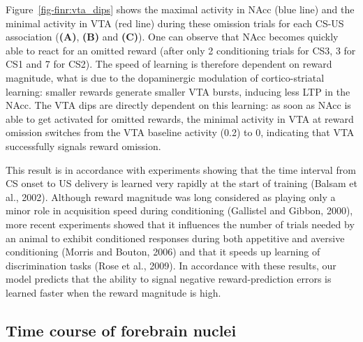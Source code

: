 \documentclass[
  11pt,
  a4paper,
]{scrbook}
\begin{document}
Figure~\ref{fig-finr:vta_dips} shows the maximal activity in NAcc (blue
line) and the minimal activity in VTA (red line) during these omission
trials for each CS-US association (\textbf{(A)}, \textbf{(B)} and
\textbf{(C)}). One can observe that NAcc becomes quickly able to react
for an omitted reward (after only 2 conditioning trials for CS3, 3 for
CS1 and 7 for CS2). The speed of learning is therefore dependent on
reward magnitude, what is due to the dopaminergic modulation of
cortico-striatal learning: smaller rewards generate smaller VTA bursts,
inducing less LTP in the NAcc. The VTA dips are directly dependent on
this learning: as soon as NAcc is able to get activated for omitted
rewards, the minimal activity in VTA at reward omission switches from
the VTA baseline activity (0.2) to 0, indicating that VTA successfully
signals reward omission.

This result is in accordance with experiments showing that the time
interval from CS onset to US delivery is learned very rapidly at the
start of training (Balsam et al., 2002). Although reward magnitude was
long considered as playing only a minor role in acquisition speed during
conditioning (Gallistel and Gibbon, 2000), more recent experiments
showed that it influences the number of trials needed by an animal to
exhibit conditioned responses during both appetitive and aversive
conditioning (Morris and Bouton, 2006) and that it speeds up learning of
discrimination tasks (Rose et al., 2009). In accordance with these
results, our model predicts that the ability to signal negative
reward-prediction errors is learned faster when the reward magnitude is
high.

\subsection{Time course of forebrain
nuclei}\label{time-course-of-forebrain-nuclei}
\end{document}
